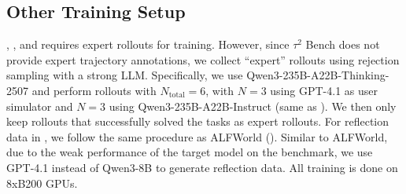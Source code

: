 \subsection{Other Training Setup}
\label{subsec:tau2_other_setup}
\distill{}, \IWM{}, and \ICRIT{} requires expert rollouts for training. However, since $\tau^{2}$ Bench does not provide expert trajectory annotations, we collect ``expert'' rollouts using rejection sampling with a strong LLM.
Specifically, we use Qwen3-235B-A22B-Thinking-2507 and perform rollouts with $N_{\mathrm{total}}=6$, with $N=3$ using GPT-4.1 as user simulator and $N=3$ using Qwen3-235B-A22B-Instruct (same as ).
We then only keep rollouts that successfully solved the tasks as expert rollouts.
For reflection data in \ICRIT{}, we follow the same procedure as ALFWorld (). Similar to ALFWorld, due to the weak performance of the target model on the benchmark, we use GPT-4.1 instead of Qwen3-8B to generate reflection data.
All training is done on 8xB200 GPUs.

